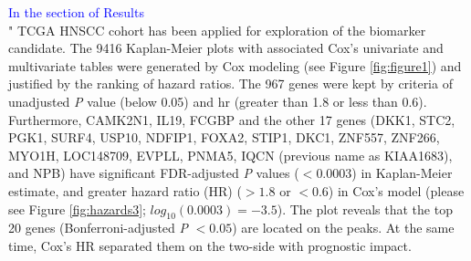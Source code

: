 \documentclass[preprint,12pt]{elsarticle}
\newenvironment{MyIndent}
{\par\leftskip1cm\relax\rightskip1cm\relax}
{\par\leftskip0cm\relax\rightskip0cm\relax}
\newenvironment{MyColorPar}[1]{%
    \leavevmode\color{#1}\ignorespaces%
}{%
}%
\begin{document}
\begin{MyColorPar}{blue}
\begin{MyIndent}
\begin{MyColorPar}{red}
\textcolor{blue}{In the section of Results}\\
"
TCGA HNSCC cohort has been applied for exploration of the biomarker candidate.
The 9416 Kaplan-Meier plots with associated Cox's univariate and multivariate tables were generated by Cox modeling (see Figure \ref{fig:figure1}) and justified by the ranking of hazard ratios.
The 967 genes were kept by criteria of unadjusted \textit{P} value (below 0.05) and \acrfull{hr} (greater than 1.8 or less than 0.6).
Furthermore, CAMK2N1, IL19, FCGBP and the other 17 genes (DKK1, STC2, PGK1, SURF4, USP10, NDFIP1, FOXA2, STIP1, DKC1, ZNF557, ZNF266, MYO1H, LOC148709, EVPLL, PNMA5, IQCN (previous name as KIAA1683), and NPB) have significant FDR-adjusted \textit{P} values ($<0.0003$) in Kaplan-Meier estimate, and greater hazard ratio (HR) ($> 1.8$ or $< 0.6$) in Cox's model (please see Figure \ref{fig:hazards3}; $log_{10}(0.0003)=-3.5$).
The plot reveals that the top 20 genes (Bonferroni-adjusted \textit{P} $< 0.05$) are located on the peaks. At the same time, Cox's HR separated them on the two-side with prognostic impact.


\end{MyColorPar}
\end{MyIndent}
\end{MyColorPar}
\end{document}
